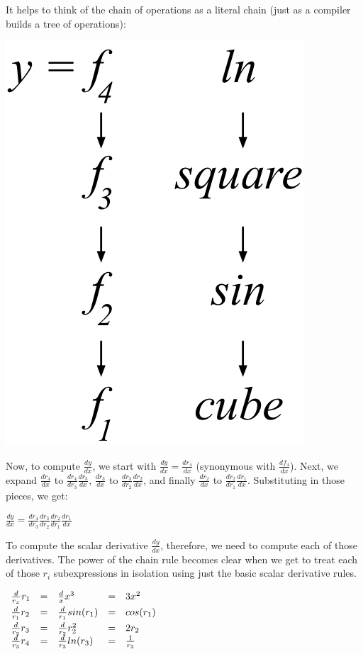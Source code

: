 \documentclass[11pt]{article}
\begin{document}
It helps to think of the chain of operations as a literal chain (just as a compiler builds a tree of operations):

\includegraphics{chain-tree.png}

Now, to compute $\frac{dy}{dx}$, we start with $\frac{dy}{dx} = \frac{dr_4}{dx}$ (synonymous with $\frac{df_4}{dx}$). Next, we expand $\frac{dr_4}{dx}$ to $\frac{dr_4}{dr_3}\frac{dr_3}{dx}$, $\frac{dr_3}{dx}$ to $\frac{dr_3}{dr_2}\frac{dr_2}{dx}$, and finally $\frac{dr_2}{dx}$ to $\frac{dr_2}{dr_1}\frac{dr_1}{dx}$.  Substituting in those pieces, we get:

$\frac{dy}{dx} = \frac{d r_4}{dr_3} \frac{dr_3}{d r_2} \frac{dr_2}{dr_1} \frac{dr_1}{dx}$

To compute the scalar derivative $\frac{dy}{dx}$, therefore, we need to compute each of those derivatives.  The power of the chain rule becomes clear when we get to treat each of those $r_i$ subexpressions in isolation using just the basic scalar derivative rules.

$\begin{array}{lllll}
\vspace{1mm}
\frac{d}{r_x} r_1 & = & \frac{d}{x} x^3 & = & 3x^2\\
\vspace{1mm}
\frac{d}{r_1} r_2 & = & \frac{d}{r_1} sin(r_1) & = & cos(r_1) \\
\frac{d}{r_2} r_3 & = & \frac{d}{r_2} r_2^2 & =& 2r_2\\
\frac{d}{r_3} r_4 & = & \frac{d}{r_3} ln(r_3) & =& \frac{1}{r_3}\\
\end{array}$
\end{document}
